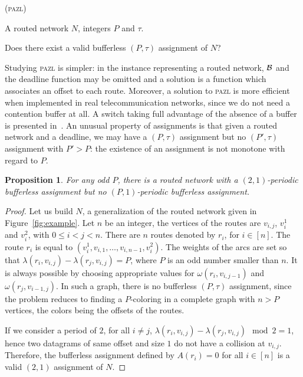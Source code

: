 \documentclass[a4paper,10pt]{journal}
\newtheorem{proposition}{Proposition}
\newcommand\pazl{\textsc{pazl}\xspace}
\begin{document}
     \bigskip

      (\pazl)

        A routed network $N$, integers $P$ and $\tau$.
      
       Does there exist a valid bufferless $(P,\tau)$ assignment of $N$?
      \bigskip


     Studying \pazl is simpler: in the instance representing a routed network, $\cal{B}$ and the deadline function may be omitted and a solution is a function which associates an offset to each route.  Moreover, a solution to \pazl is more efficient when implemented in real telecommunication networks, since we do not need a contention buffer at all. A switch taking full advantage of the absence of a buffer is presented in~\cite{Marc2201:Experimental}. 
      An unusual property of assignments is that given a routed network and a deadline, we may have a $(P,\tau)$ assignment but no $(P',\tau)$ assignment with $P' > P$: the existence of an assignment is not monotone with regard to $P$.

	\begin{proposition} \label{prop:monotonic}
	 For any odd $P$, there is a routed network with a $(2,1)$-periodic bufferless assignment but no $(P,1)$-periodic bufferless assignment.
	\end{proposition}

	\begin{proof}
      Let us build $N$, a generalization of the routed network given in Figure~\ref{fig:example}. 
      Let $n$ be an integer, the vertices of the routes are $v_{i,j}$, $v_i^1$ and $v_i^2$, with $0 \leq i < j <n$. 
      There are $n$ routes denoted by $r_i$, for $i \in [n]$. The route $r_i$ is equal to $(v_i^1,v_{i,1},\dots,v_{i,n-1},v_i^2)$. The weights of the arcs are set so that $\lambda(r_i, v_{i,j}) - \lambda(r_j,v_{i,j})= P$, where $P$ is an odd number smaller than $n$. It is always possible by choosing appropriate values for $\omega(r_i,v_{i,j-1})$ and $\omega(r_j,v_{i-1,j})$. In such a graph, there is no bufferless $(P,\tau)$ assignment, since the problem reduces to finding a $P$-coloring in a complete graph with $n > P$ vertices, the colors being the offsets of the routes.


      If we consider a period of $2$, for all $i \neq j$, $\lambda(r_i, v_{i,j}) - \lambda(r_j, v_{i,j}) \mod 2 = 1$, hence two datagrams of same offset and size $1$ do not have a collision at $v_{i,j}$. Therefore, the bufferless assignment defined by $A(r_i) = 0$ for all $i \in [n]$ is a valid $(2,1)$ assignment of $N$.      
\end{proof}
\end{document}
